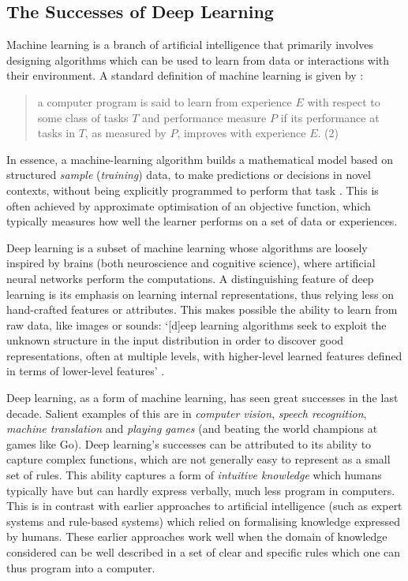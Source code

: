 \documentclass{amsart}
\theoremstyle{indented}
\theoremstyle{indentedProp}
\theoremstyle{indented}
\theoremstyle{indented}
\theoremstyle{indented}
\theoremstyle{indented}
\theoremstyle{indented}
\begin{document}
\subsection{The Successes of Deep Learning}
\label{sec:Assumption2}

Machine learning is a branch of artificial intelligence that primarily involves designing algorithms which can be used to learn from data or interactions with their environment. A standard definition of machine learning is given by \citet{Mitchell-1997}:
\begin{quote}
    a computer program is said to learn from experience $E$ with respect to some class of tasks $T$ and performance measure $P$ if its performance at tasks in $T$, as measured by $P$, improves with experience $E$. (2)
\end{quote}
In essence, a machine-learning algorithm builds a mathematical model based on structured {\it sample} ({\it training}) data, to make predictions or decisions in novel contexts, without being explicitly programmed to perform that task \citep{Koza-et-al-1996, Bishop-2006}. This is often achieved by approximate optimisation of an objective function, which typically measures how well the learner performs on a set of data or experiences.

Deep learning is a subset of machine learning whose algorithms are loosely inspired by brains (both neuroscience and cognitive science), where artificial neural networks perform the computations. A distinguishing feature of deep learning is its emphasis on learning internal representations, thus relying less on hand-crafted features or attributes. This makes possible the ability to learn from raw data, like images or sounds: `[d]eep learning algorithms seek to exploit the unknown structure in the input distribution in order to discover good representations, often at multiple levels, with higher-level learned features defined in terms of lower-level features' \citep[p. 17]{Bengio-2012}.

Deep learning, as a form of machine learning, has seen great successes in the last decade. Salient examples of this are in {\it computer vision}, {\it speech recognition},  {\it machine translation} and {\it playing games} (and beating the world champions at games like Go). Deep learning's successes can be attributed to its ability to capture complex functions, which are not generally easy to represent as a small set of rules. This ability captures a form of {\it intuitive knowledge} which humans typically have but can hardly express verbally, much less program in computers. This is in contrast with earlier approaches to artificial intelligence (such as expert systems and rule-based systems) which relied on formalising knowledge expressed by humans. These earlier approaches work well when the domain of knowledge considered can be well described in a set of clear and specific rules which one can thus program into a computer. 
\end{document}
